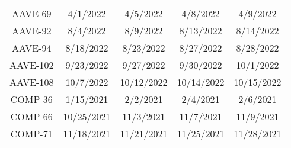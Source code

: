 \begin{landscape}
\begin{table}[htbp]
\begin{tabular*}{\linewidth}{@{\extracolsep{\fill}}ccccc}
    AAVE-69     & 4/1/2022 & 4/5/2022 & 4/8/2022 & 4/9/2022 \\[2pt]
     AAVE-92      & 8/4/2022 & 8/9/2022 & 8/13/2022 & 8/14/2022 \\[2pt]
    AAVE-94         & 8/18/2022 & 8/23/2022 & 8/27/2022 & 8/28/2022 \\[2pt]
    AAVE-102       & 9/23/2022 & 9/27/2022 & 9/30/2022 & 10/1/2022 \\[2pt]
    AAVE-108       & 10/7/2022 & 10/12/2022 & 10/14/2022 & 10/15/2022 \\[2pt]
       COMP-36       & 1/15/2021 & 2/2/2021 & 2/4/2021 & 2/6/2021 \\[2pt]
    COMP-66       & 10/25/2021 & 11/3/2021 & 11/7/2021 & 11/9/2021 \\[2pt]
     COMP-71      & 11/18/2021 & 11/21/2021 & 11/25/2021 & 11/28/2021 \\[2pt]

\end{tabular*}
\end{table}
\end{landscape}

